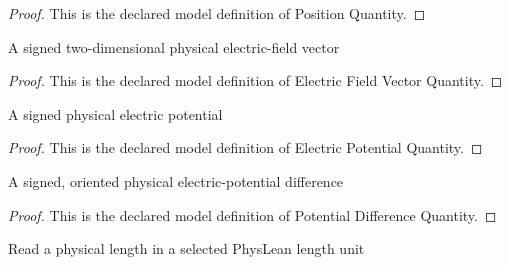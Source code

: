 \begin{proof}
  This is the declared model definition of Position Quantity.
\end{proof}
\begin{definition}
  \label{def:physics:phyx-mini-0874:phyxminiproblems-problemphyxmini0874-electricfieldvectorquantity}
  A signed two-dimensional physical electric-field vector
\end{definition}
\begin{proof}
  This is the declared model definition of Electric Field Vector Quantity.
\end{proof}
\begin{definition}
  \label{def:physics:phyx-mini-0874:phyxminiproblems-problemphyxmini0874-electricpotentialquantity}
  A signed physical electric potential
\end{definition}
\begin{proof}
  This is the declared model definition of Electric Potential Quantity.
\end{proof}
\begin{definition}
  \label{def:physics:phyx-mini-0874:phyxminiproblems-problemphyxmini0874-potentialdifferencequantity}
  A signed, oriented physical electric-potential difference
\end{definition}
\begin{proof}
  This is the declared model definition of Potential Difference Quantity.
\end{proof}
\begin{definition}
  \label{def:physics:phyx-mini-0874:phyxminiproblems-problemphyxmini0874-lengthreadout}
  Read a physical length in a selected PhysLean length unit
\end{definition}
